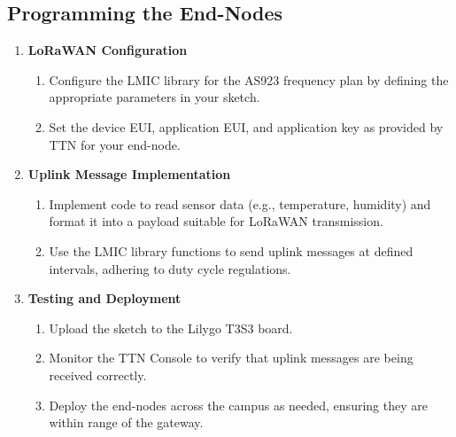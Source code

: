 \subsection{Programming the End-Nodes}
\begin{enumerate}
    \item \textbf{LoRaWAN Configuration}
          \begin{enumerate}
              \item Configure the LMIC library for the AS923 frequency plan by defining the appropriate parameters in your sketch.
              \item Set the device EUI, application EUI, and application key as provided by TTN for your end-node.
          \end{enumerate}
    \item \textbf{Uplink Message Implementation}
          \begin{enumerate}
              \item Implement code to read sensor data (e.g., temperature, humidity) and format it into a payload suitable for LoRaWAN transmission.
              \item Use the LMIC library functions to send uplink messages at defined intervals, adhering to duty cycle regulations.
          \end{enumerate}
    \item \textbf{Testing and Deployment}
          \begin{enumerate}
              \item Upload the sketch to the Lilygo T3S3 board.
              \item Monitor the TTN Console to verify that uplink messages are being received correctly.
              \item Deploy the end-nodes across the campus as needed, ensuring they are within range of the gateway.
          \end{enumerate}
\end{enumerate}

